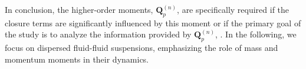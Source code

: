 In conclusion, the higher-order moments, $\textbf{Q}_p^{(n)}$, are specifically required if the closure terms are significantly influenced by this moment or if the primary goal of the study is to analyze the information provided by $\textbf{Q}_p^{(n)}$, .
In the following, we focus on dispersed fluid-fluid suspensions, emphasizing the role of mass and momentum moments in their dynamics.